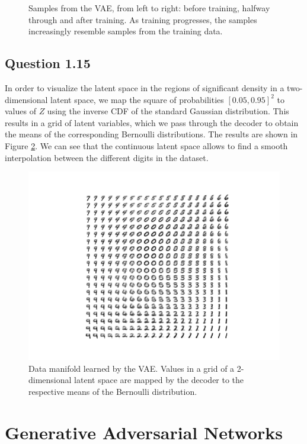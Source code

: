 \documentclass{article}
\begin{document}
\begin{figure}[t]
\begin{subfigure}{0.32\textwidth}
\end{subfigure}
 \caption{Samples from the VAE, from left to right: before training, halfway through and after training. As training progresses, the samples increasingly resemble samples from the training data.}
\label{fig:vae_samples}
\end{figure}

\subsection*{Question 1.15}

In order to visualize the latent space in the regions of significant density in a two-dimensional latent space, we map the square of probabilities $[0.05, 0.95]^2$ to values of $Z$ using the inverse CDF of the standard Gaussian distribution. This results in a grid of latent variables, which we pass through the decoder to obtain the means of the corresponding Bernoulli distributions. The results are shown in Figure \ref{fig:manifold}. We can see that the continuous latent space allows to find a smooth interpolation between the different digits in the dataset.

\begin{figure}[t]
\centering
\includegraphics[scale=0.8]{img/manifold}
\caption{Data manifold learned by the VAE. Values in a grid of a 2-dimensional latent space are mapped by the decoder to the respective means of the Bernoulli distribution.}
\label{fig:manifold}
\end{figure}

\section{Generative Adversarial Networks}
\end{document}
